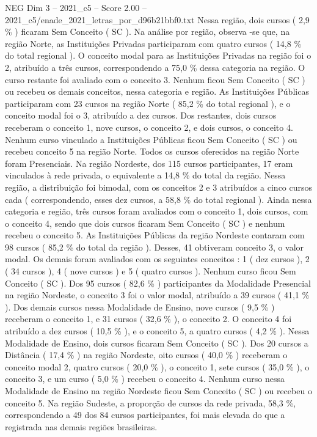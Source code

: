 \begin{textsample}{NEG Dim 3 – 2021\_c5 – Score 2.00 – 2021\_c5/enade\_2021\_letras\_por\_d96b21bbf0.txt}
Nessa região, dois cursos ( 2,9 \% ) ficaram Sem Conceito ( SC ).
Na análise por região, observa -se que, na região Norte, as Instituições Privadas participaram com quatro cursos ( 14,8 \% do total regional ).
O conceito modal para as Instituições Privadas na região foi o 2, atribuído a três cursos, correspondendo a 75,0 \% dessa categoria na região.
O curso restante foi avaliado com o conceito 3.
Nenhum ficou Sem Conceito ( SC ) ou recebeu os demais conceitos, nessa categoria e região.
As Instituições Públicas participaram com 23 cursos na região Norte ( 85,2 \% do total regional ), e o conceito modal foi o 3, atribuído a dez cursos.
Dos restantes, dois cursos receberam o conceito 1, nove cursos, o conceito 2, e dois cursos, o conceito 4.
Nenhum curso vinculado a Instituições Públicas ficou Sem Conceito ( SC ) ou recebeu conceito 5 na região Norte.
Todos os cursos oferecidos na região Norte foram Presenciais.
Na região Nordeste, dos 115 cursos participantes, 17 eram vinculados à rede privada, o equivalente a 14,8 \% do total da região.
Nessa região, a distribuição foi bimodal, com os conceitos 2 e 3 atribuídos a cinco cursos cada ( correspondendo, esses dez cursos, a 58,8 \% do total regional ).
Ainda nessa categoria e região, três cursos foram avaliados com o conceito 1, dois cursos, com o conceito 4, sendo que dois cursos ficaram Sem Conceito ( SC ) e nenhum recebeu o conceito 5.
As Instituições Públicas da região Nordeste contaram com 98 cursos ( 85,2 \% do total da região ).
Desses, 41 obtiveram conceito 3, o valor modal.
Os demais foram avaliados com os seguintes conceitos : 1 ( dez cursos ), 2 ( 34 cursos ), 4 ( nove cursos ) e 5 ( quatro cursos ).
Nenhum curso ficou Sem Conceito ( SC ).
Dos 95 cursos ( 82,6 \% ) participantes da Modalidade Presencial na região Nordeste, o conceito 3 foi o valor modal, atribuído a 39 cursos ( 41,1 \% ).
Dos demais cursos nessa Modalidade de Ensino, nove cursos ( 9,5 \% ) receberam o conceito 1, e 31 cursos ( 32,6 \% ), o conceito 2.
O conceito 4 foi atribuído a dez cursos ( 10,5 \% ), e o conceito 5, a quatro cursos ( 4,2 \% ).
Nessa Modalidade de Ensino, dois cursos ficaram Sem Conceito ( SC ).
Dos 20 cursos a Distância ( 17,4 \% ) na região Nordeste, oito cursos ( 40,0 \% ) receberam o conceito modal 2, quatro cursos ( 20,0 \% ), o conceito 1, sete cursos ( 35,0 \% ), o conceito 3, e um curso ( 5,0 \% ) recebeu o conceito 4.
Nenhum curso nessa Modalidade de Ensino na região Nordeste ficou Sem Conceito ( SC ) ou recebeu o conceito 5.
Na região Sudeste, a proporção de cursos da rede privada, 58,3 \%, correspondendo a 49 dos 84 cursos participantes, foi mais elevada do que a registrada nas demais regiões brasileiras.

\end{textsample}
